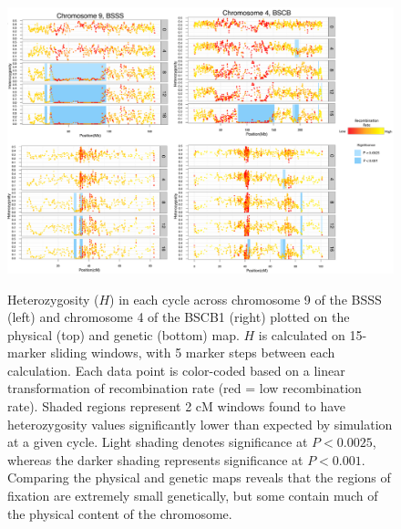 \begin{figure}[tb]   
  \begin{center}
   \includegraphics[width=\linewidth]{fig45}
   \caption{Heterozygosity ($H$) in each cycle across chromosome 9 of the BSSS (left) and chromosome 4 of the BSCB1 (right) plotted on the physical (top) and genetic (bottom) map. $H$ is calculated on 15-marker sliding windows, with 5 marker steps between each calculation. Each data point is color-coded based on a linear transformation of recombination rate (red = low recombination rate). Shaded regions represent 2 cM windows found to have heterozygosity values significantly lower than expected by simulation at a given cycle. Light shading denotes significance at $P<0.0025$, whereas the darker shading represents significance at $P<0.001$. Comparing the physical and genetic maps reveals that the regions of fixation are extremely small genetically, but some contain much of the physical content of the chromosome.
} 
\vspace{-6mm}
    \label{fig:genphys}
  \end{center}
\end{figure}

